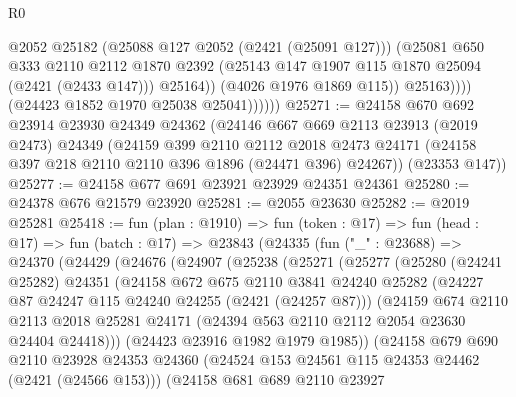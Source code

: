 \begin{lexlean}{R0}
\begin{coremodule}
                          @2052
                          @25182
                          (@25088 @127 @2052 (@2421 (@25091 @127)))
                          (@25081
                            @650
                            @333
                            @2110
                            @2112
                            @1870
                            @2392
                            (@25143 @147 @1907 @115 @1870 @25094 (@2421 (@2433 @147)))
                            @25164))
                        (@4026 @1976 @1869 @115))
                      @25163))))
              (@24423 @1852 @1970 @25038 @25041))))))
@25271 := @24158
    @670
    @692
    @23914
    @23930
    @24349
    @24362
    (@24146
      @667
      @669
      @2113
      @23913
      (@2019 @2473)
      @24349
      (@24159
        @399
        @2110
        @2112
        @2018
        @2473
        @24171
        (@24158 @397 @218 @2110 @2110 @396 @1896 (@24471 @396) @24267))
      (@23353 @147))
@25277 := @24158 @677 @691 @23921 @23929 @24351 @24361
@25280 := @24378 @676 @21579 @23920
@25281 := @2055 @23630
@25282 := @2019 @25281
@25418 := fun (plan : @1910) =>
  fun (token : @17) =>
  fun (head : @17) =>
  fun (batch : @17) =>
  @23843
    (@24335
      (fun ("_" : @23688) =>
      @24370
        (@24429
          (@24676
            (@24907
              (@25238
                (@25271
                  (@25277
                    (@25280
                      (@24241 @25282)
                      @24351
                      (@24158
                        @672
                        @675
                        @2110
                        @3841
                        @24240
                        @25282
                        (@24227 @87 @24247 @115 @24240 @24255 (@2421 (@24257 @87)))
                        (@24159
                          @674
                          @2110
                          @2113
                          @2018
                          @25281
                          @24171
                          (@24394 @563 @2110 @2112 @2054 @23630 @24404 @24418)))
                      (@24423 @23916 @1982 @1979 @1985))
                    (@24158
                      @679
                      @690
                      @2110
                      @23928
                      @24353
                      @24360
                      (@24524 @153 @24561 @115 @24353 @24462 (@2421 (@24566 @153)))
                      (@24158
                        @681
                        @689
                        @2110
                        @23927

\end{coremodule}
\end{lexlean}
